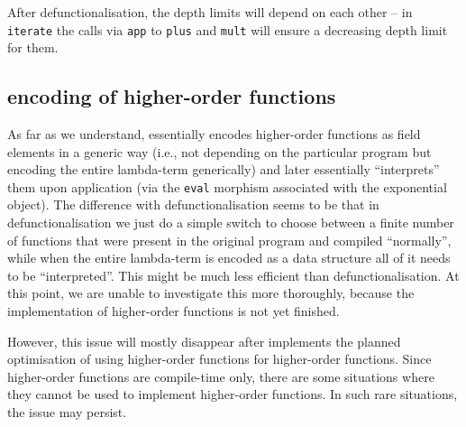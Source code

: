 \documentclass[
    9pt,            %
    techreport,        %
    affiltop,       %
]{art}
\begin{document}
After defunctionalisation, the depth limits will depend on each other --
in \texttt{iterate} the calls via \texttt{app} to \texttt{plus} and
\texttt{mult} will ensure a decreasing depth limit for them.

\subsection{\Geb{} encoding of higher-order functions}

As far as we understand, \Geb{} essentially encodes higher-order functions
as field elements in a generic way (i.e., not depending on the
particular program but encoding the entire lambda-term generically)
and later essentially ``interprets'' them upon application (via the
\texttt{eval} morphism associated with the exponential object). The
difference with defunctionalisation seems to be that in
defunctionalisation we just do a simple switch to choose between a
finite number of functions that were present in the original program
and compiled ``normally'', while when the entire lambda-term is
encoded as a data structure all of it needs to be
``interpreted''. This might be much less
efficient than defunctionalisation. At this point, we are
unable to investigate this more thoroughly, because the \Geb{} implementation of higher-order functions is not yet finished.

However, this issue will mostly disappear after \Geb{} implements the
planned optimisation of using higher-order \VampIR{} functions for \Geb{} higher-order functions. Since \VampIR{} higher-order functions are compile-time only, there are some situations where they cannot be used to implement \Geb{} higher-order functions. In such rare situations, the issue may persist.
\end{document}
